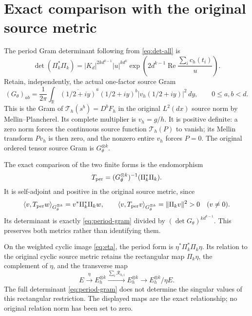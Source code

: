 \documentclass[11pt]{article}
\begin{document}
\section{Exact comparison with the original source metric}

The period Gram determinant following from \eqref{eq:det-all} is
\begin{equation}
 \det(\Pi_k^*\Pi_k)=|K_d|^{2k d^{k-1}}|u|^{k d^k}
    \exp\!\left(2d^{k-1}\operatorname{Re}
                    \frac{\sum_i c_h(t_i)}u\right).
 \label{eq:period-gram}
\end{equation}
Retain, independently, the actual one-factor source Gram
\begin{equation}
 (G_\theta)_{ab}=\frac1{2\pi}\int_{\mathbb R}
     \overline{(1/2+iy)}^{a}(1/2+iy)^b
       |v_h(1/2+iy)|^2\,dy,\qquad 0\le a,b<d.
 \label{eq:theta-gram}
\end{equation}
This is the Gram of $\mathcal T_h(s^b)=D^bF_h$ in the original
$L^2(dx)$ source norm by Mellin--Plancherel.  Its complete multiplier is
$v_h=g/h$.  It is positive definite: a zero norm forces the continuous
source function $\mathcal T_h(P)$ to vanish; its Mellin transform
$Pv_h$ is then zero, and the nonzero entire $v_h$ forces $P=0$.
The original ordered tensor source Gram is $G_\theta^{\otimes k}$.

The exact comparison of the two finite forms is the endomorphism
\begin{equation}
 T_{\rm per}=(G_\theta^{\otimes k})^{-1}(\Pi_k^*\Pi_k).
 \label{eq:metric-map}
\end{equation}
It is self-adjoint and positive in the original source metric, since
\[
 \langle v,T_{\rm per}w\rangle_{G_\theta^{\otimes k}}
     =v^*\Pi_k^*\Pi_k w,
 \qquad
 \langle v,T_{\rm per}v\rangle_{G_\theta^{\otimes k}}
     =\|\Pi_kv\|^2>0\quad(v\ne0).
\]
Its determinant is exactly \eqref{eq:period-gram} divided by
$(\det G_\theta)^{k d^{k-1}}$.  This preserves both metrics rather
than identifying them.

On the weighted cyclic image \eqref{eq:eta}, the period form is
$\eta^*\Pi_k^*\Pi_k\eta$.  Its relation to the original cyclic
source metric retains the rectangular map $\Pi_k\eta$, the complement
of $\eta$, and the transverse map
\[
 E\xrightarrow{\eta}E_h^{\otimes k}
 \xrightarrow{\sum_i\mathcal R_{h,i}}E_h^{\otimes k}
 \longrightarrow E_h^{\otimes k}/\eta E.
\]
The full determinant \eqref{eq:period-gram} does not determine the
singular values of this rectangular restriction.  The displayed maps
are the exact relationship; no original relation norm has been set to
zero.
\end{document}
